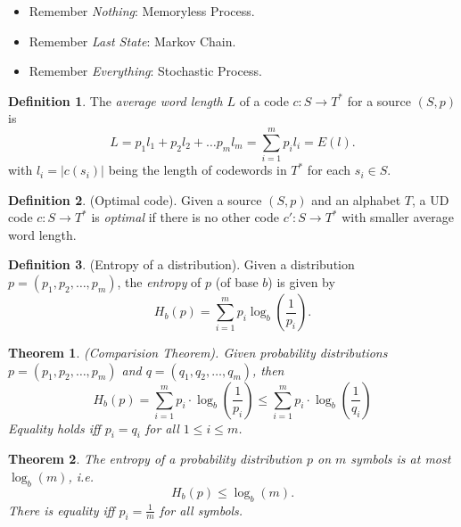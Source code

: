 \documentclass[a4paper]{article}
\newtheorem{theorem}{Theorem}
\theoremstyle{definition} \newtheorem*{definition}{Definition}
\begin{document}
\begin{remark}
  \hfill
  \begin{itemize}
    \item Remember \emph{Nothing}: Memoryless Process.
    \item Remember \emph{Last State}: Markov Chain.
    \item Remember \emph{Everything}: Stochastic Process.
  \end{itemize}
\end{remark}

\begin{definition}
  The \emph{average word length} $L$ of a code $c : S \rightarrow T^*$ for
  a source $(S,p)$ is 
  \[
    \boxed{L = p_1l_1 + p_2l_2 + \dots p_ml_m = \sum_{i=1}^m p_il_i = E(l).}
  \]
  with $l_i = |c(s_i)|$ being the length of codewords in $T^*$ for each
  $s_i \in S$.
\end{definition}

\begin{definition}
  (Optimal code). Given a source $(S, p)$ and an alphabet $T$, a 
  UD code $c:S \rightarrow T^*$ is \emph{optimal} if there is no other 
  code $c' : S \rightarrow T^*$ with smaller average word length.
\end{definition}

\begin{definition}
  (Entropy of a distribution). Given a distribution $p = (p_1, p_2, \dots,
  p_m)$, the \emph{entropy} of $p$ (of base $b$) is given by
  \[
    \boxed{  H_b(p) = \sum_{i=1}^m p_i \log_b \left( \frac{1}{p_i} \right).}
  \]
\end{definition}

\begin{theorem}
  (Comparision Theorem). Given probability distributions $p = 
  \left( p_1, p_2, \dots , p_m \right)$ and $q = \left( q_1, q_2, \dots
  , q_m\right)$, then
  \[
   \boxed{ H_b(p) = \sum_{i=1}^m p_i \cdot \log_b\left( \frac{1}{p_i} \right)
   \leq \sum_{i=1}^m p_i \cdot\log_b\left( \frac{1}{q_i} \right)}
  \]
  \label{thm:comparison}
  Equality holds iff $p_i = q_i$ for all $1 \leq i \leq m$.
\end{theorem}

\begin{theorem}
  The entropy of a probability distribution $p$ on $m$ symbols is at most
  $\log_b(m)$, i.e. 
  \[
    \boxed{ H_b(p) \leq \log_b(m).}
  \]
  There is equality iff $p_i = \frac{1}{m}$ for all symbols.
  \label{thm:uniform}
\end{theorem}
\end{document}

